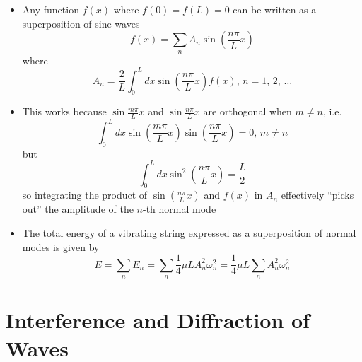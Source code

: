 \documentclass{article}
\begin{document}
\begin{itemize}
  \item Any function $f(x)$ where $f(0) = f(L) = 0$ can be written as a superposition of sine waves \[f(x) = \sum_n A_n \sin \left( \frac{n \pi}{L} x \right)\] where \[A_n = \frac{2}{L} \int_0^L dx \sin \left( \frac{n \pi}{L} x \right) f(x), \,n = 1, \,2, \,\ldots\]

  \item This works because $\sin \frac{m \pi}{L} x$ and $\sin \frac{n \pi}{L} x$ are orthogonal when $m \ne n$, i.e. \[\int_0^L dx \sin \left( \frac{m \pi}{L} x \right) \sin \left( \frac{n \pi}{L} x \right) = 0, \,m \ne n\] but \[\int_0^L dx \sin^2 \left( \frac{n \pi}{L} x \right) = \frac{L}{2}\] so integrating the product of $\sin \left( \frac{n \pi}{L} x \right)$ and $f(x)$ in $A_n$ effectively ``picks out'' the amplitude of the $n$-th normal mode

  \item The total energy of a vibrating string expressed as a superposition of normal modes is given by \[E = \sum_n E_n = \sum_n \frac{1}{4} \mu L A_n^2 \omega_n^2 = \frac{1}{4} \mu L \sum_n A_n^2 \omega_n^2\]
\end{itemize}

\section{Interference and Diffraction of Waves}
\end{document}
